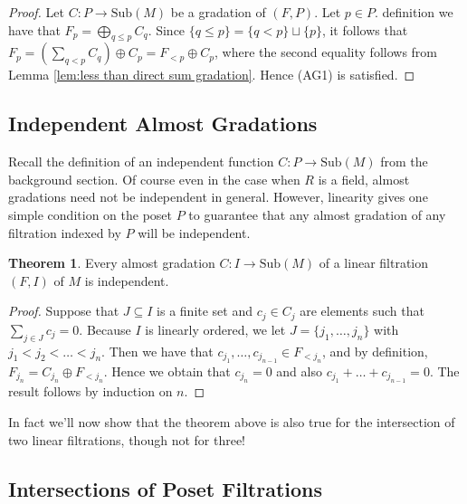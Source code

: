 \documentclass[oneside,11pt]{amsart}
\newcommand{\Sub}{\ensuremath{\text{Sub}}}
\theoremstyle{definition}
\newtheorem{proof techniques}{Proof Techniques}
\newtheorem{theorem}{Theorem}
\begin{document}
\begin{proof}
Let $C: P \to \Sub(M)$ be a gradation of $(F , P)$. Let $p \in P$. definition we have that $F_p = \bigoplus_{q \leq p} C_q$. Since $\{ q \leq p \} = \{ q < p \} \sqcup \{ p \}$, it follows that $F_p = \left( \sum_{q < p} C_q \right) \oplus C_p = F_{< p} \oplus C_p$, where the second equality follows from Lemma \ref{lem:less than direct sum gradation}. Hence (AG1) is satisfied. 
\end{proof}




\subsection{Independent Almost Gradations}

Recall the definition of an independent function $C: P \to \Sub(M)$ from the background section. Of course even in the case when $R$ is a field, almost gradations need not be independent in general. However, linearity gives one simple condition on the poset $P$ to guarantee that any almost gradation of any filtration indexed by $P$ will be independent.  


\begin{theorem}\label{thm:ag of a linear filt is ind}
Every almost gradation $C: I \to \Sub(M)$ of a linear filtration $(F , I)$ of $M$ is independent. 
\end{theorem}

\begin{proof}
Suppose that $J \subseteq I$ is a finite set and $c_j \in C_j$ are elements such that $\sum_{j \in J} c_j = 0$. Because $I$ is linearly ordered, we let $J = \{ j_1, \ldots, j_n \}$ with $j_1 < j_2 < \ldots < j_n$. Then we have that $c_{j_1}, \ldots, c_{j_{n - 1}} \in F_{< j_n}$, and by definition, $F_{j_n} = C_{j_n} \oplus F_{< j_n}$. Hence we obtain that $c_{j_n} = 0$ and also $c_{j_1} + \ldots + c_{j_{n - 1}} = 0$. The result follows by induction on $n$.
\end{proof}


In fact we'll now show that the theorem above is also true for the intersection of two linear filtrations, though not for three!

\subsection{Intersections of Poset Filtrations}
\end{document}
